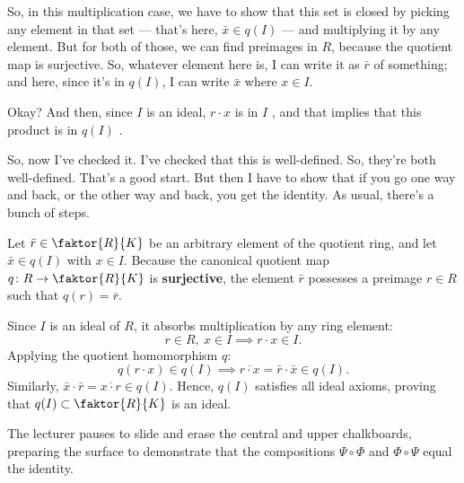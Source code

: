 \begin{proofWrapper}
\begin{speech}[00:26:54 - 00:28:26]
So, in this multiplication case, we have to show that this set is closed by picking any element in that set --- that's here, $\bar{x} \in q(I)$  --- and multiplying it by any element. But for both of those, we can find preimages in $R$, because the quotient map is surjective. So, whatever element here is, I can write it as $\bar{r}$ of something; and here, since it's in $q(I)$, I can write $\bar{x}$ where $x \in I$.

Okay? And then, since $I$ is an ideal, $r \cdot x$ is in $I$ , and that implies that this product is in $q(I)$ .

So, now I've checked it. I've checked that this is well-defined. So, they're both well-defined. That's a good start. But then I have to show that if you go one way and back, or the other way and back, you get the identity. As usual, there's a bunch of steps.
\end{speech}

\begin{content}
Let $\bar{r} \in \faktor{R}{K}$ be an arbitrary element of the quotient ring, and let $\bar{x} \in q(I)$ with $x \in I$.
Because the canonical quotient map $q \colon R \to \faktor{R}{K}$ is \textbf{surjective}, the element $\bar{r}$ possesses a preimage $r \in R$ such that $q(r) = \bar{r}$.

Since $I$ is an ideal of $R$, it absorbs multiplication by any ring element:
\[
r \in R, \ x \in I \implies r \cdot x \in I.
\]
Applying the quotient homomorphism $q$:
\[
q(r \cdot x) \in q(I) \implies \overline{r \cdot x} = \bar{r} \cdot \bar{x} \in q(I).
\]
Similarly, $\bar{x} \cdot \bar{r} = \overline{x \cdot r} \in q(I)$.
Hence, $q(I)$ satisfies all ideal axioms, proving that $q(I) \subset \faktor{R}{K}$ is an ideal.
\end{content}

\begin{hidden}
\end{hidden}

\begin{note}
The lecturer pauses to slide and erase the central and upper chalkboards, preparing the surface to demonstrate that the compositions $\Psi \circ \Phi$ and $\Phi \circ \Psi$ equal the identity.
\end{note}


\end{proofWrapper}
